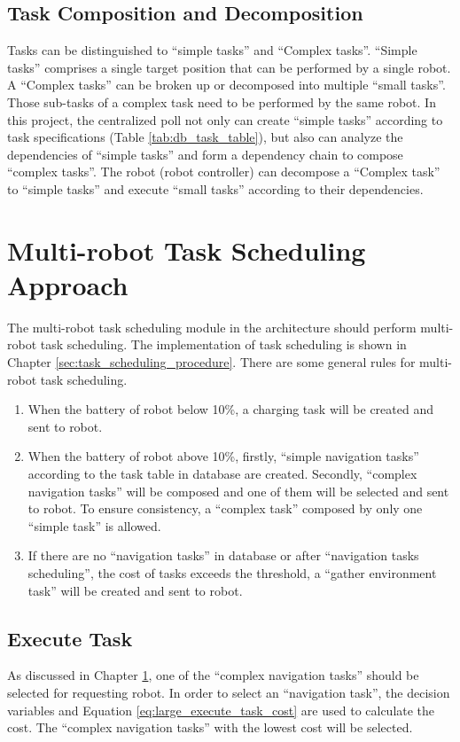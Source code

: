 \subsection{Task Composition and Decomposition}
Tasks can be distinguished to ``simple tasks'' and ``Complex tasks''.  ``Simple tasks'' comprises a single target position that can be performed by a single robot. A ``Complex tasks'' can be broken up or decomposed into multiple ``small tasks''. Those sub-tasks of a complex task need to be performed by the same robot.
In this project, the centralized poll not only can create ``simple tasks'' according to task specifications (Table \ref{tab:db_task_table}), but also can analyze the dependencies of ``simple tasks'' and form a dependency chain to compose ``complex tasks''. The robot (robot controller) can decompose a ``Complex task'' to ``simple tasks'' and execute ``small tasks'' according to their dependencies.

\section{Multi-robot Task Scheduling Approach}
\label{sec:task_scheduling_approach}

The multi-robot task scheduling module in the architecture should perform multi-robot task scheduling. 
The implementation of task scheduling is shown in Chapter \ref{sec:task_scheduling_procedure}. There are some general rules for multi-robot task scheduling.


\begin{enumerate}
	\item When the battery of robot below 10\%, a charging task will be created and sent to robot.
	\item When the battery of robot above 10\%, firstly, ``simple navigation tasks'' according to the task table in database are created. Secondly, ``complex navigation tasks'' will be composed and one of them will be selected and sent to robot. To ensure consistency, a ``complex task'' composed by only one ``simple task'' is allowed. 
    \item If there are no ``navigation tasks'' in database or after ``navigation tasks scheduling'', the cost of tasks exceeds the threshold, a ``gather environment task'' will be created and sent to robot.
\end{enumerate}

\subsection{Execute Task}
As discussed in Chapter \ref{sec:task_scheduling_approach}, one of the ``complex navigation tasks'' should be selected for requesting robot. In order to select an ``navigation task'', the decision variables and Equation \ref{eq:large_execute_task_cost} are used to calculate the cost. The ``complex navigation tasks'' with the lowest cost will be selected.

